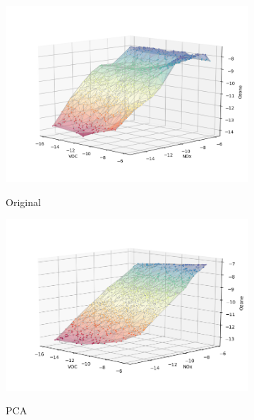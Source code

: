\begin{figure}[H]
\begin{subfigure}{.33\textwidth}
  \centering
  \includegraphics[width=\textwidth]{4fig/original.png}
  \label{fig:iorig}
  \caption{Original}
\end{subfigure}%
\begin{subfigure}{.33\textwidth}
  \centering
  \includegraphics[width=\textwidth]{4fig/rpca.png}
  \label{fig:ipca}
  \caption{PCA}
\end{subfigure}%
\begin{subfigure}{.33\textwidth}
  \centering

\end{subfigure}
\end{figure}
